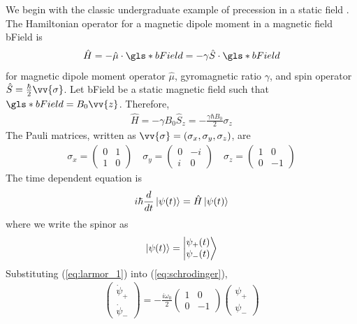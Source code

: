We begin with the classic undergraduate example of precession in a static field \cite{griffiths_quantum}. The Hamiltonian operator for a magnetic dipole moment in a magnetic field \gls*{bField} is
%
\begin{align}
    \hat{H}=-\hat{\mu}\cdot\gls*{bField}=-\gamma\hat{S}\cdot \gls*{bField}\label{eq:hamiltonian_operator}
\end{align}
%
for magnetic dipole moment operator $\hat{\mu}$, gyromagnetic ratio $\gamma$, and spin operator $\hat{S}=\frac{\hbar}{2}\vv{\sigma}$. Let \gls*{bField} be a static magnetic field such that $\gls*{bField}=B_0 \vv{z}$. Therefore,
%
\begin{gather}
    \hat{H}=-\gamma B_0 \hat{S}_z=-\frac{\gamma \hbar B_0}{2}\sigma_z\label{eq:larmor_1}
\end{gather}
%
The Pauli matrices, written as $\vv{\sigma}=(\sigma_x, \sigma_y, \sigma_z)$, are
%
\begin{gather}
    \sigma_{x}=\left(\begin{matrix}
    0 & 1\\
    1 & 0
    \end{matrix}\right)\quad
    \sigma_{y}=\left(\begin{matrix}
    0 & -i\\
    i & 0
    \end{matrix}\right)\quad
    \sigma_{z}=\left(\begin{matrix}
    1 & 0\\
    0 & -1
    \end{matrix}\right)
\end{gather}
%
The time dependent \schrodinger equation is
%
\begin{gather}
    i\hbar\frac{d}{dt}\Ket{\psi(t)}=\hat{H}\Ket{\psi(t)} \label{eq:schrodinger}
\end{gather}
%
where we write the spinor as 
\begin{gather}
    \Ket{\psi(t)}=\Ket{\begin{matrix}
        \psi_+(t)\\
        \psi_-(t)
    \end{matrix}}\label{eq:spinor}  
\end{gather}
%
Substituting (\ref{eq:larmor_1}) into (\ref{eq:schrodinger}),
\begin{gather}
    \left(\begin{matrix}
        \dot{\psi}_+\\
        \dot{\psi}_-
    \end{matrix}\right)
    = -\frac{i\omega_0}{2}
    \left(\begin{matrix}
        1 & 0\\
        0 & -1
    \end{matrix} \right)
    \left(\begin{matrix}
        \psi_+\\
        \psi_-
    \end{matrix}\right)\label{eq:larmor_2}
\end{gather}
